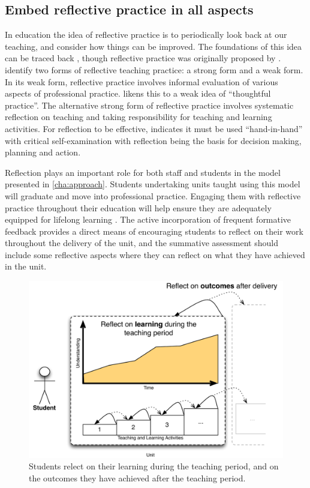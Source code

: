 
\subsection{Embed reflective practice in all aspects} %
\label{ssub:embed_reflective_practice_in_all_aspects}

In education the idea of reflective practice is to periodically look back at our teaching, and consider how things can be improved. The foundations of this idea can be traced back \citet{Dewey:1933}, though reflective practice was originally proposed by \citet{Schon:1983}. \citet{Farrell:2007,Farrell:2008} identify two forms of reflective teaching practice: a strong form and a weak form. In its weak form, reflective practice involves informal evaluation of various aspects of professional practice. \citet{Farrell:2008} likens this to a weak idea of ``thoughtful practice''. The alternative strong form of reflective practice involves systematic reflection on teaching and taking responsibility for teaching and learning activities. For reflection to be effective, \citet{Richards:1994} indicates it must be used ``hand-in-hand'' with critical self-examination with reflection being the basis for decision making, planning and action.

Reflection plays an important role for both staff and students in the model presented in \cref{cha:approach}. Students undertaking units taught using this model will graduate and move into professional practice. Engaging them with reflective practice throughout their education will help ensure they are adequately equipped for lifelong learning \cite{Field:2006}. The active incorporation of frequent formative feedback provides a direct means of encouraging students to reflect on their work throughout the delivery of the unit, and the summative assessment should include some reflective aspects where they can reflect on what they have achieved in the unit.

\begin{figure}[ptbh]
	\centering
	\includegraphics[width=\textwidth]{StudentReflection}
	\caption{Students relect on their learning during the teaching period, and on the outcomes they have achieved after the teaching period.}
	\label{fig:student_reflection}
\end{figure}

